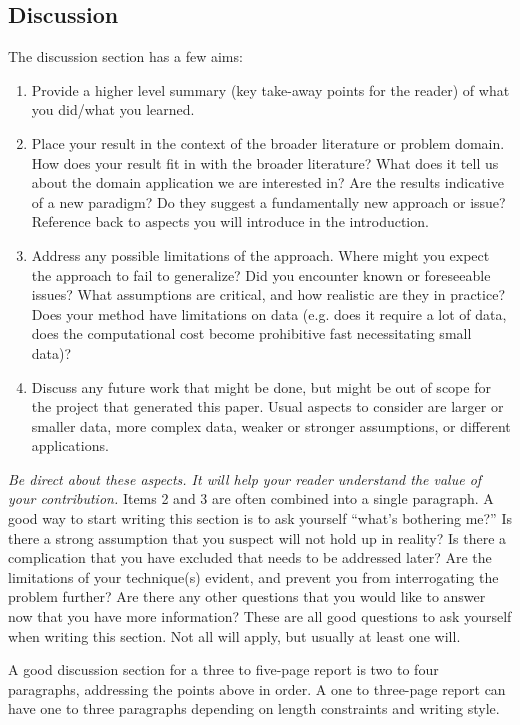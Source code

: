 \documentclass[]{article}
\begin{document}
\subsection{Discussion}

The discussion section has a few aims:
\begin{enumerate}
    \item Provide a higher level summary (key take-away points for the reader) of what you did/what you learned.
    \item Place your result in the context of the broader literature or problem domain. How does your result fit in with the broader literature? What does it tell us about the domain application we are interested in? Are the results indicative of a new paradigm? Do they suggest a fundamentally new approach or issue? Reference back to aspects you will introduce in the introduction.
    \item Address any possible limitations of the approach. Where might you expect the approach to fail to generalize? Did you encounter known or foreseeable issues?
          What assumptions are critical, and how realistic are they in practice? Does your method have limitations on data (e.g. does it require a lot of data, does the computational cost become prohibitive fast necessitating small data)?
    \item Discuss any future work that might be done, but might be out of scope for the project that generated this paper. Usual aspects to consider are larger or smaller data, more complex data, weaker or stronger assumptions, or different applications.
\end{enumerate}

\emph{Be direct about these aspects. It will help your reader understand the value of your contribution.}
Items 2 and 3 are often combined into a single paragraph. A good way to start writing this section is to ask yourself ``what's bothering me?'' Is there a strong assumption that you suspect will not hold up in reality? Is there a complication that you have excluded that needs to be addressed later? Are the limitations of your technique(s) evident, and prevent you from interrogating the problem further? Are there any other questions that you would like to answer now that you have more information? These are all good questions to ask yourself when writing this section. Not all will apply, but usually at least one will.

A good discussion section for a three to five-page report is two to four paragraphs, addressing the points above in order. A one to three-page report can have one to three paragraphs depending on length constraints and writing style.
\end{document}
